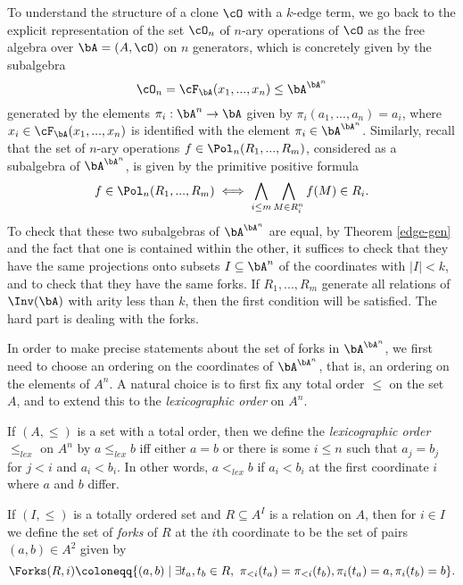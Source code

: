 To understand the structure of a clone $\cO$ with a $k$-edge term, we go back to the explicit representation of the set $\cO_n$ of $n$-ary operations of $\cO$ as the free algebra over $\bA = (A,\cO)$ on $n$ generators, which is concretely given by the subalgebra
\[
\cO_n = \cF_\bA(x_1, ..., x_n) \le \bA^{\bA^n}
\]
generated by the elements $\pi_i : \bA^n \rightarrow \bA$ given by $\pi_i(a_1, ..., a_n) = a_i$, where $x_i \in \cF_\bA(x_1, ..., x_n)$ is identified with the element $\pi_i \in \bA^{\bA^n}$. Similarly, recall that the set of $n$-ary operations $f \in \Pol_n(R_1, ..., R_m)$, considered as a subalgebra of $\bA^{\bA^n}$, is given by the primitive positive formula
\[
f \in \Pol_n(R_1, ..., R_m) \iff \bigwedge_{i \le m} \bigwedge_{M \in R_i^n} f(M) \in R_i.
\]
To check that these two subalgebras of $\bA^{\bA^n}$ are equal, by Theorem \ref{edge-gen} and the fact that one is contained within the other, it suffices to check that they have the same projections onto subsets $I \subseteq \bA^n$ of the coordinates with $|I| < k$, and to check that they have the same forks. If $R_1, ..., R_m$ generate all relations of $\Inv(\bA)$ with arity less than $k$, then the first condition will be satisfied. The hard part is dealing with the forks.

In order to make precise statements about the set of forks in $\bA^{\bA^n}$, we first need to choose an ordering on the coordinates of $\bA^{\bA^n}$, that is, an ordering on the elements of $A^n$. A natural choice is to first fix any total order $\le$ on the set $A$, and to extend this to the \emph{lexicographic order} on $A^n$.

\begin{defn} If $(A, \le)$ is a set with a total order, then we define the \emph{lexicographic order} $\le_{lex}$ on $A^n$ by $a \le_{lex} b$ iff either $a = b$ or there is some $i \le n$ such that $a_j = b_j$ for $j < i$ and $a_i < b_i$. In other words, $a <_{lex} b$ if $a_i < b_i$ at the first coordinate $i$ where $a$ and $b$ differ.
\end{defn}

\begin{defn} If $(I,\le)$ is a totally ordered set and $R \subseteq A^I$ is a relation on $A$, then for $i \in I$ we define the set of \emph{forks} of $R$ at the $i$th coordinate to be the set of pairs $(a,b) \in A^2$ given by
\[
\Forks(R,i) \coloneqq \{(a,b) \mid \exists t_a, t_b \in R,\ \pi_{<i}(t_a) = \pi_{<i}(t_b), \pi_i(t_a) = a, \pi_i(t_b) = b\}.
\]
\end{defn}

